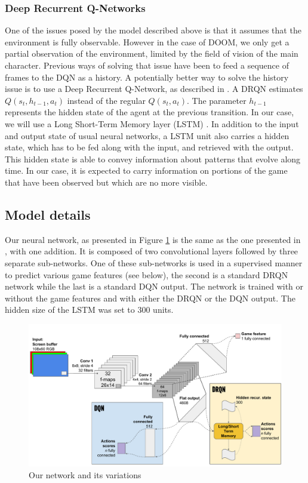 \documentclass[letterpaper]{article}
\begin{document}
\subsubsection{Deep Recurrent Q-Networks}
One of the issues posed by the model described above is that it assumes that the
environment is fully observable. However in the case of DOOM, we only get a
partial
observation of the environment, limited by the field of vision of the main
character. Previous ways of solving that issue have been to feed a sequence of
frames to the DQN as a history.
A potentially better way to solve the history issue is to use a Deep Recurrent
Q-Network, as described in \citep{Hausknecht2015}. A DRQN
estimates $Q(s_t,h_{t-1},a_t)$ instead of the regular $Q(s_t,a_t)$. The
parameter $h_{t-1}$ represents the hidden state of the agent at the previous
transition. In our case, we will use a Long Short-Term Memory layer (LSTM)
\cite{Hochreiter1997}. In addition to the input and output state of usual neural
networks, a LSTM unit also carries a hidden state, which has to be fed along
with the input, and retrieved with the output. This hidden state is able to
convey information about patterns that evolve along time. In our case, it is
expected to carry information on portions of the game that have been observed
but which are no more visible.

\subsection{Model details}
Our neural network, as presented in Figure \ref{fig:drqn-schema} is the same as
the one presented in \citep{Lample2016}, with one addition.
It is composed of two convolutional layers followed by three separate
sub-networks. One of these sub-networks is used in a supervised manner to
predict various game features (see below), the second is a standard
DRQN network while the last is a standard DQN output. The network is trained
with or without the game features and with either the DRQN or the DQN output.
The hidden size of the LSTM was set to 300 units.

\begin{figure}[h]
  \centering
  \includegraphics[width=.9\textwidth]{DRQNSchema.pdf}
  \caption{\label{fig:drqn-schema} Our network and its variations}
\end{figure}
\end{document}
